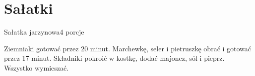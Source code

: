 \documentclass[a4paper,12pt]{article}
\begin{document}
\newpage
\section{Sałatki}

\begin{recipe}{Sałatka jarzynowa}{4 porcje}{}

Ziemniaki gotować przez 20 minut. Marchewkę, seler i pietruszkę obrać i gotować przez 17 minut.
Składniki pokroić w kostkę, dodać majonez, sól i pieprz. Wszystko wymieszać.

\end{recipe}
\end{document}
